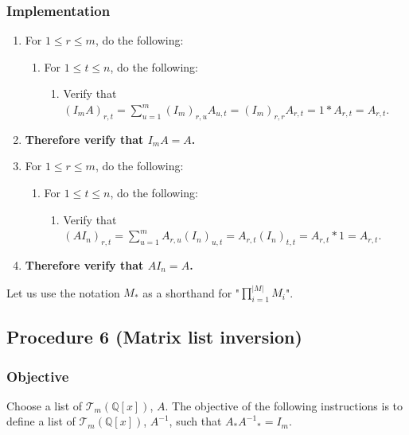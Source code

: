 \documentclass[twocolumn]{article}
\begin{document}
			\subsubsection{Implementation}
				\begin{enumerate}
					\item For $1\le r\le m$, do the following:
					\begin{enumerate}
						\item For $1\le t\le n$, do the following:
						\begin{enumerate}
							\item Verify that $(I_mA)_{r,t}=\sum_{u=1}^m (I_m)_{r,u}A_{u,t}=(I_m)_{r,r}A_{r,t}=1*A_{r,t}=A_{r,t}$.
						\end{enumerate}
					\end{enumerate}
					\item \textbf{Therefore verify that $I_mA=A$.}
					\item For $1\le r\le m$, do the following:
					\begin{enumerate}
						\item For $1\le t\le n$, do the following:
						\begin{enumerate}
							\item Verify that $(AI_n)_{r,t}=\sum_{u=1}^m A_{r,u}(I_n)_{u,t}=A_{r,t}(I_n)_{t,t}=A_{r,t}*1=A_{r,t}$.
						\end{enumerate}
					\end{enumerate}
					\item \textbf{Therefore verify that $AI_n=A$.}
				\end{enumerate}
		Let us use the notation $M_*$ as a shorthand for "$\prod_{i=1}^{\lvert M\rvert} M_i$".
		\subsection{Procedure 6 (Matrix list inversion)}\label{sec:procedure 6}
			\subsubsection{Objective}
				Choose a list of $\mathcal{T}_{m}(\mathbb{Q}[x])$, $A$. The objective of the following instructions is to define a list of $\mathcal{T}_{m}(\mathbb{Q}[x])$, $A^{-1}$, such that $A_*{A^{-1}}_*=I_m$.
\end{document}

